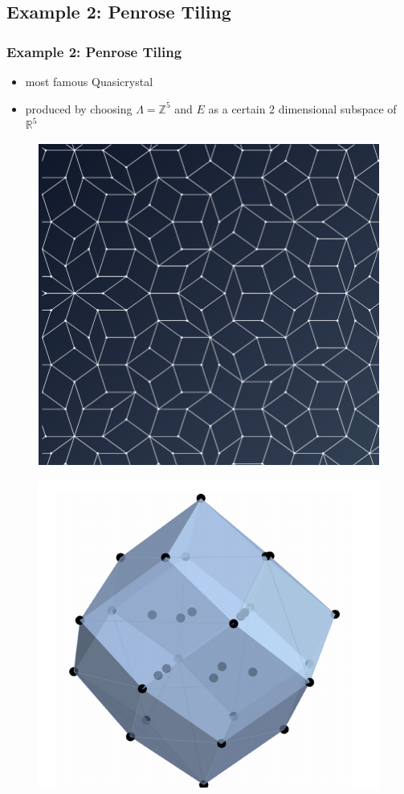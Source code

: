 \documentclass[]{beamer}
\begin{document}
\begin{frame}
  \subsection{Example 2: Penrose Tiling}
  \frametitle{Example 2: Penrose Tiling}
  \begin{itemize}
    \item most famous Quasicrystal
    \item produced by choosing $\Lambda = \mathbb{Z}^5$ and $E$ as a certain 2 dimensional subspace of $\mathbb{R}^5$
  \end{itemize}
  \begin{figure}
    \begin{minipage}{.5\textwidth}
      \centering
      \includegraphics[width=.4\linewidth]{assets/PenroseTiling.png}
      \label{fig:Penrose Tiling}
    \end{minipage}%
    \begin{minipage}{.5\textwidth}
      \centering
      \includegraphics[width=.4\linewidth]{assets/CutWindowPenrose.png}
      \label{fig:Cut window for Penrose tiling}
    \end{minipage}
    \end{figure}
\end{frame}
\end{document}
